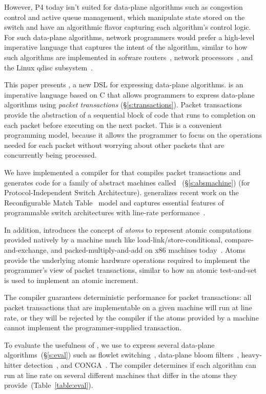 However, P4 today isn't suited for data-plane algorithms such as congestion
control and active queue management, which manipulate state stored on the
switch and have an algorithmic flavor capturing each algorithm's control logic.
For such data-plane algorithms, network programmers would prefer a high-level
imperative language that captures the intent of the algorithm, similar to how
such algorithms are implemented in sofware routers~\cite{click}, network
processors~\cite{packetc, nova}, and the Linux qdisc subsystem~\cite{qdisc}.

This paper presents \pktlanguage, a new DSL for expressing data-plane
algorithms. \pktlanguage is an imperative language based on C that allows
programmers to express data-plane algorithms using {\em packet transactions}
(\S\ref{s:transactions}).  Packet transactions provide the abstraction of a
sequential block of code that runs to completion on each packet before
executing on the next packet. This is a convenient programming model, because it
allows the programmer to focus on the operations needed for each packet without
worrying about other packets that are concurrently being processed.

We have implemented a compiler for \pktlanguage that compiles \pktlanguage
packet transactions and generates code for a family of abstract machines called
\absmachine~(\S\ref{s:absmachine}) (for Protocol-Independent Switch
Architecture). \absmachine generalizes recent work on the Reconfigurable Match
Table~\cite{rmt} model and captures essential features of programmable switch
architectures with line-rate performance~\cite{rmt, xpliant, flexpipe}.

In addition, \absmachine introduces the concept of {\em atoms} to represent
atomic computations provided natively by a \absmachine machine much like
load-link/store-conditional, compare-and-exchange, and packed-multiply-and-add
on x86 machines today~\cite{x86_manual}.  Atoms provide the underlying atomic
hardware operations required to implement the programmer's view of packet
transactions, similar to how an atomic test-and-set is used to implement an
atomic increment.

The \pktlanguage compiler guarantees deterministic performance for packet
transactions: all packet transactions that are implementable on a given
\absmachine machine will run at line rate, or they will be rejected by the
compiler if the atoms provided by a \absmachine machine cannot implement the
programmer-supplied transaction.

To evaluate the usefulness of \pktlanguage, we use \pktlanguage to express
several data-plane algorithms~(\S\ref{s:eval}) such as flowlet
switching~\cite{flowlets}, data-plane bloom filters~\cite{bloom}, heavy-hitter
detection~\cite{opensketch}, and CONGA~\cite{conga}.  The \pktlanguage compiler
determines if each algorithm can run at line rate on several different
\absmachine machines that differ in the atoms they
provide~(Table~\ref{table:eval}).
